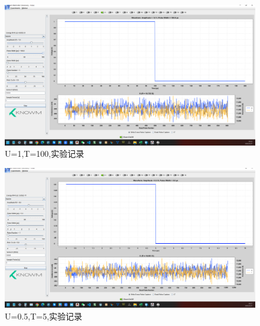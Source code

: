 \documentclass[12pt,hyperref,a4paper,UTF8]{ctexart}
\begin{document}
\begin{figure}[H]
    \centering
    \begin{minipage}{1\textwidth}
        \centering
        \includegraphics[width=1\textwidth]{figures/U1T100.png}
        \caption{U=1,T=100,实验记录}
        \label{fig:system_block_diagram}
    \end{minipage}
\end{figure}

\begin{figure}[H]
    \centering
    \begin{minipage}{1\textwidth}
        \centering
        \includegraphics[width=1\textwidth]{figures/U05T5.png}
        \caption{U=0.5,T=5,实验记录}
        \label{fig:U05T5}
    \end{minipage}
\end{figure}
\end{document}
